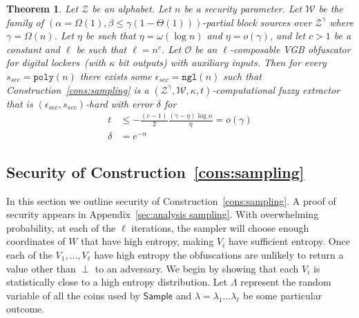 \documentclass[11pt]{article}
\newcommand{\apref}[1]{\mbox{Appendix~\ref{#1}}}
\newcommand{\lemref}[1]{\mbox{Lemma~\ref{#1}}}
\newcommand{\consref}[1]{\mbox{Construction~\ref{#1}}}
\newcommand{\class}[1]{{\ensuremath{\mathsf{#1}}}}
\newcommand{\sample}{\ensuremath{\class{Sample}}\xspace}
\newcommand{\poly}{\ensuremath{\mathtt{poly}}\xspace}
\newcommand{\ngl}{\ensuremath{\mathtt{ngl}}\xspace}
\newtheorem{theorem}{Theorem}[section]
\begin{document}
\begin{theorem}
\label{thm:sampling}
Let $\mathcal{Z}$ be an alphabet.  Let $n$ be a security parameter.  Let $\mathcal{W}$ be the family of $(\alpha = \Omega(1), \beta\leq \gamma(1-\Theta(1)))$-partial block sources over $\mathcal{Z}^\gamma$ where $\gamma =\Omega(n)$.  Let $\eta$ be such that $\eta = \omega(\log n)$ and $\eta = o(\gamma)$, and let $c> 1$ be a constant and $\ell$ be such that $\ell = n^c$.  Let $\mathcal{O}$ be an $\ell$-composable VGB obfuscator for digital lockers~(with $\kappa$ bit outputs) with auxiliary inputs.  Then for every $s_{sec} = \poly(n)$ there exists some $\epsilon_{sec} = \ngl(n)$ such that \consref{cons:sampling} is a $(\mathcal{Z}^\gamma, \mathcal{W}, \kappa, t)$-computational fuzzy extractor that is $(\epsilon_{sec}, s_{sec})$-hard with error $\delta$ for
\begin{align*}
t&\leq -\frac{(c-1)}{2} \frac{(\gamma-\eta)\log n}{\eta} = o(\gamma)\\
\delta &= e^{-n}
\end{align*}
\end{theorem}
 
\subsection{Security of \consref{cons:sampling}}
\label{ssec:sec cons sampling}
In this section we outline security of \consref{cons:sampling}.  A proof of security appears in \apref{sec:analysis sampling}.
With overwhelming probability, at each of the $\ell$ iterations, the sampler will choose enough coordinates of $W$ that have high entropy, making $V_i$ have sufficient entropy.   Once each of the $V_1,..., V_\ell$ have high entropy the obfuscations are unlikely to return a value other than $\perp$ to an adversary.
We begin by showing that each $V_i$ is statistically close to a high entropy distribution.   Let $\Lambda$ represent the random variable of all the coins used by $\sample$ and $\lambda=\lambda_1 \dots \lambda_\ell$
be some particular outcome.
\end{document}
